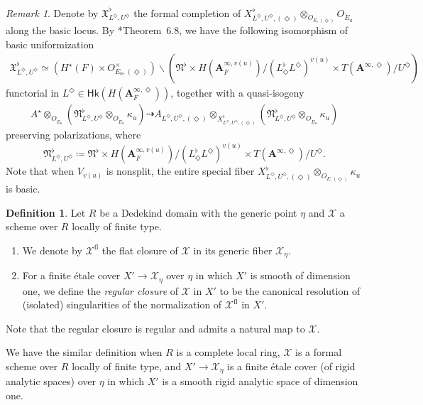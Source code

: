 \documentclass[12pt]{amsart}
\numberwithin{equation}{section}
\theoremstyle{plain}
\theoremstyle{definition}
\newtheorem{definition}[proposition]{Definition}
\theoremstyle{remark}
\newtheorem{remark}[proposition]{Remark}
\renewcommand{\b}[1]{\mathbf{#1}}
\renewcommand{\c}[1]{\mathcal{#1}}
\newcommand{\f}[1]{\mathfrak{#1}}
\renewcommand{\r}[1]{\mathrm{#1}}
\renewcommand{\sf}[1]{\mathsf{#1}}
\renewcommand{\(}{\left(}
\renewcommand{\)}{\right)}
\newcommand{\bA}{\b A}
\newcommand{\cX}{\c X}
\newcommand{\fN}{\f N}
\newcommand{\fX}{\f X}
\newcommand{\Hk}{\sf{Hk}}
\begin{document}
\begin{remark}
Denote by $\fX^\flat_{L^\Diamond,U^\Diamond}$ the formal completion of $X^\flat_{L^\Diamond,U^\Diamond,(\Diamond)}\otimes_{O_{E,(\Diamond)}}O_{\breve{E}_u}$ along the basic locus. By \cite{LMZ}*{Theorem~6.8}, we have the following isomorphism of basic uniformization
\begin{align}\label{eq:uniformization_1}
\fX^\flat_{L^\Diamond,U^\Diamond}\simeq (H^\star(F)\times O_{E_0,(\Diamond)}^\times)\backslash\(\fN^\flat\times H(\bA_F^{\infty,v(u)})/(L^\flat_\Diamond L^\Diamond)^{v(u)}\times T(\bA^{\infty,\Diamond})/U^\Diamond\)
\end{align}
functorial in $L^\Diamond\in\Hk(H(\bA_F^{\infty,\Diamond}))$, together with a quasi-isogeny
\begin{align}\label{eq:uniformization_2}
A^\star\otimes_{O_{\breve{E}_u}}(\fN^\flat_{L^\Diamond,U^\Diamond}\otimes_{O_{\breve{E}_u}}\kappa_u)\dashrightarrow
A_{L^\Diamond,U^\Diamond,(\Diamond)}\otimes_{X^\flat_{L^\Diamond,U^\Diamond,(\Diamond)}}
(\fN^\flat_{L^\Diamond,U^\Diamond}\otimes_{O_{\breve{E}_u}}\kappa_u)
\end{align}
preserving polarizations, where
\[
\fN^\flat_{L^\Diamond,U^\Diamond}\coloneqq
\fN^\flat\times H(\bA_F^{\infty,v(u)})/(L^\flat_\Diamond L^\Diamond)^{v(u)}\times T(\bA^{\infty,\Diamond})/U^\Diamond.
\]
Note that when $V_{v(u)}$ is nonsplit, the entire special fiber $X^\flat_{L^\Diamond,U^\Diamond,(\Diamond)}\otimes_{O_{E,(\Diamond)}}\kappa_u$ is basic.
\end{remark}



\begin{definition}\label{de:regular_closure}
Let $R$ be a Dedekind domain with the generic point $\eta$ and $\cX$ a scheme over $R$ locally of finite type.
\begin{enumerate}
  \item We denote by $\cX^{\r{fl}}$ the flat closure of $\cX$ in its generic fiber $\cX_\eta$.

  \item For a finite \'{e}tale cover $X'\to\cX_\eta$ over $\eta$ in which $X'$ is smooth of dimension one, we define the \emph{regular closure} of $\cX$ in $X'$ to be the canonical resolution of (isolated) singularities of the normalization of $\cX^{\r{fl}}$ in $X'$.
\end{enumerate}
Note that the regular closure is regular and admits a natural map to $\cX$.

We have the similar definition when $R$ is a complete local ring, $\cX$ is a formal scheme over $R$ locally of finite type, and $X'\to\cX_\eta$ is a finite \'{e}tale cover (of rigid analytic spaces) over $\eta$ in which $X'$ is a smooth rigid analytic space of dimension one.
\end{definition}
\end{document}
